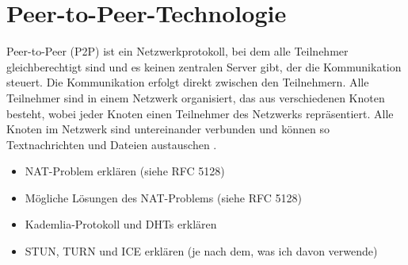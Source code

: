 \section{Peer-to-Peer-Technologie}


Peer-to-Peer (P2P) ist ein Netzwerkprotokoll, bei dem alle Teilnehmer gleichberechtigt sind und es 
keinen zentralen Server gibt, der die Kommunikation steuert. Die Kommunikation erfolgt direkt zwischen 
den Teilnehmern. Alle Teilnehmer sind in einem Netzwerk organisiert, das aus verschiedenen Knoten 
besteht, wobei jeder Knoten einen Teilnehmer des Netzwerks repräsentiert. Alle Knoten im Netzwerk 
sind untereinander verbunden und können so Textnachrichten und Dateien austauschen 
\parencite[\textcolor{red}{S. x-y}]{Mahlmann_P2PNetzwerke}.

\begin{itemize}
    \item NAT-Problem erklären (siehe RFC 5128)
    \item Mögliche Lösungen des NAT-Problems (siehe RFC 5128)
    \item Kademlia-Protokoll und DHTs erklären
    \item STUN, TURN und ICE erklären (je nach dem, was ich davon verwende)
\end{itemize}